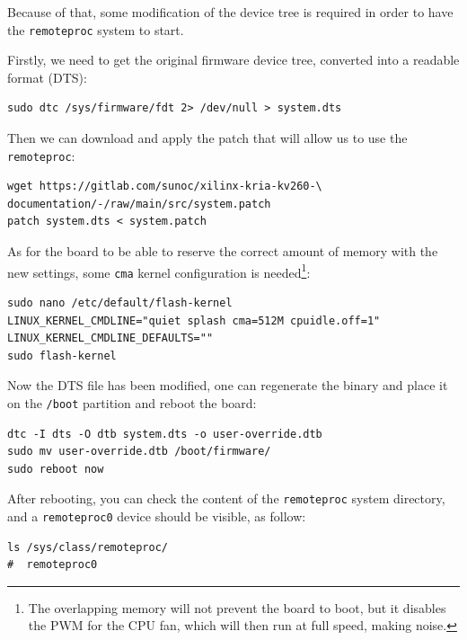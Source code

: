 \documentclass[10pt]{article}
\begin{document}
Because of that, some modification of the device tree is required in order to have
the \verb|remoteproc| system to start.

Firstly, we need to get the original firmware device tree, converted
into a readable format (DTS):
\begin{tcolorbox}
\begin{verbatim}
sudo dtc /sys/firmware/fdt 2> /dev/null > system.dts
\end{verbatim}
\end{tcolorbox}

Then we can download and apply the patch that will allow us to use the \verb|remoteproc|:
\begin{tcolorbox}
\begin{verbatim}
wget https://gitlab.com/sunoc/xilinx-kria-kv260-\
documentation/-/raw/main/src/system.patch
patch system.dts < system.patch
\end{verbatim}
\end{tcolorbox}

As for the board to be able to reserve the correct amount of memory with the new settings, some
\verb|cma| kernel configuration is needed\footnote{The overlapping memory will not prevent the board to boot,
  but it disables the PWM for the CPU fan, which will then run at full speed, making noise.}:
\begin{tcolorbox}
\begin{verbatim}
sudo nano /etc/default/flash-kernel
LINUX_KERNEL_CMDLINE="quiet splash cma=512M cpuidle.off=1"
LINUX_KERNEL_CMDLINE_DEFAULTS=""
sudo flash-kernel
\end{verbatim}
\end{tcolorbox}

Now the DTS file has been modified, one can regenerate the binary and place it on the \verb|/boot| partition
and reboot the board:
\begin{tcolorbox}
\begin{verbatim}
dtc -I dts -O dtb system.dts -o user-override.dtb
sudo mv user-override.dtb /boot/firmware/
sudo reboot now
\end{verbatim}
\end{tcolorbox}

After rebooting, you can check the content of the \verb|remoteproc| system directory,
and a \verb|remoteproc0| device should be visible, as follow:
\begin{tcolorbox}
\begin{verbatim}
ls /sys/class/remoteproc/
#  remoteproc0
\end{verbatim}
\end{tcolorbox}
\end{document}
